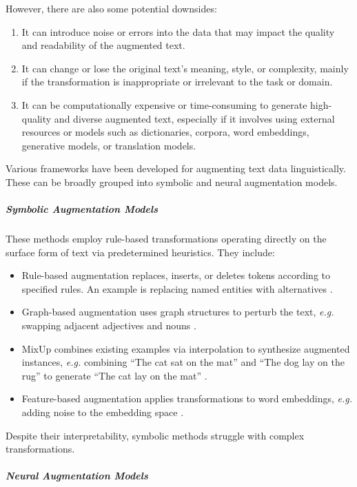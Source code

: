 However, there are also some potential downsides:     
\begin{enumerate}   
    \item It can introduce noise or errors into the data that may impact the quality and readability of the augmented text.
    \item It can change or lose the original text's meaning, style, or complexity, mainly if the transformation is inappropriate or irrelevant to the task or domain.   
    \item It can be computationally expensive or time-consuming to generate high-quality and diverse augmented text, especially if it involves using external resources or models such as dictionaries, corpora, word embeddings, generative models, or translation models.
\end{enumerate}

Various frameworks have been developed for augmenting text data linguistically. These can be broadly grouped into symbolic and neural augmentation models.

\subparagraph{Symbolic Augmentation Models}

These methods employ rule-based transformations operating directly on the surface form of text via predetermined heuristics. They include:

\begin{itemize}     
  \item Rule-based augmentation replaces, inserts, or deletes tokens according to specified rules. An example is replacing named entities with alternatives \cite{wei_eda_2019}.   
   \item Graph-based augmentation uses graph structures to perturb the text, \textit{e.g.} swapping adjacent adjectives and nouns \cite{ahmed_text_2023}.  
  \item MixUp combines existing examples via interpolation to synthesize augmented instances, \textit{e.g.} combining ``The cat sat on the mat'' and  ``The dog lay on the rug'' to generate ``The cat lay on the mat'' \cite{guo_augmenting_2019}.
  \item Feature-based augmentation applies transformations to word embeddings, \textit{e.g.} adding noise to the embedding space \cite{cheung_modals_2021}.        
\end{itemize}   

Despite their interpretability, symbolic methods struggle with complex transformations.

\subparagraph{Neural Augmentation Models}


